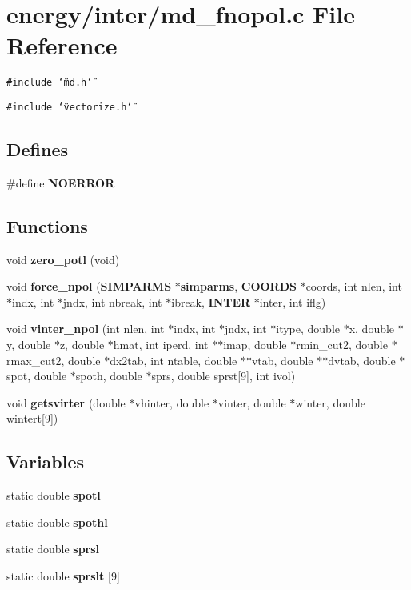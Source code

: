 \section{energy/inter/md\_\-fnopol.c File Reference}
\label{md__fnopol_8c}
{\tt \#include \char`\"{}md.h\char`\"{}}\par
{\tt \#include \char`\"{}vectorize.h\char`\"{}}\par
\subsection*{Defines}
\begin{CompactItemize}
\item 
\#define {\bf NOERROR}
\end{CompactItemize}
\subsection*{Functions}
\begin{CompactItemize}
\item 
void {\bf zero\_\-potl} (void)
\item 
void {\bf force\_\-npol} ({\bf SIMPARMS} $\ast${\bf simparms}, {\bf COORDS} $\ast$coords, int nlen, int $\ast$indx, int $\ast$jndx, int nbreak, int $\ast$ibreak, {\bf INTER} $\ast$inter, int iflg)
\item 
void {\bf vinter\_\-npol} (int nlen, int $\ast$indx, int $\ast$jndx, int $\ast$itype, double $\ast$x, double $\ast$y, double $\ast$z, double $\ast$hmat, int iperd, int $\ast$$\ast$imap, double $\ast$rmin\_\-cut2, double $\ast$rmax\_\-cut2, double $\ast$dx2tab, int ntable, double $\ast$$\ast$vtab, double $\ast$$\ast$dvtab, double $\ast$spot, double $\ast$spoth, double $\ast$sprs, double sprst[9], int ivol)
\item 
void {\bf getsvirter} (double $\ast$vhinter, double $\ast$vinter, double $\ast$winter, double wintert[9])
\end{CompactItemize}
\subsection*{Variables}
\begin{CompactItemize}
\item 
static double {\bf spotl}
\item 
static double {\bf spothl}
\item 
static double {\bf sprsl}
\item 
static double {\bf sprslt} [9]
\end{CompactItemize}


